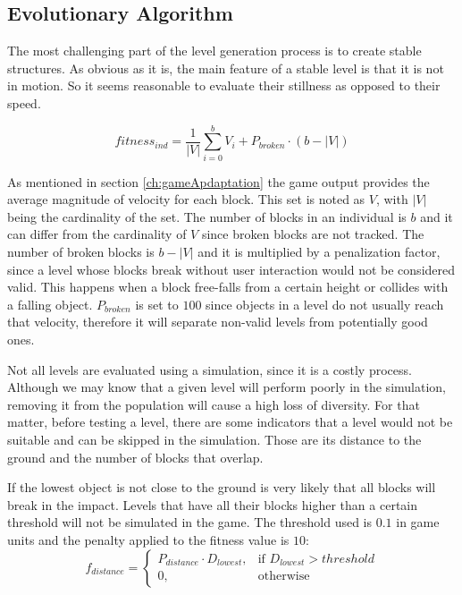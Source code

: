 \subsection{Evolutionary Algorithm}\label{ch:Representation}

The most challenging part of the level generation process is to create stable structures. As obvious as it is, the main feature of a stable level is that it is not in motion. So it seems reasonable to evaluate their stillness as opposed to their speed.

$$fitness_{ind} = \frac{1}{|V|}\sum_{i=0}^{b}{V_i} + P_{broken}\cdot(b-|V|)$$

As mentioned in section \ref{ch:gameApdaptation} the game output provides the average magnitude of velocity for each block. This set is noted as $V$, with $|V|$ being the cardinality of the set. The number of blocks in an individual is $b$ and it can differ from the cardinality of $V$ since broken blocks are not tracked. The number of broken blocks is $b-|V|$ and it is multiplied by a penalization factor, since a level whose blocks break without user interaction would not be considered valid. This happens when a block free-falls from a certain height or collides with a falling object. $P_{broken}$ is set to $100$ since objects in a level do not usually reach that velocity, therefore it will separate non-valid levels from potentially good ones.

  

Not all levels are evaluated using a simulation, since it is a costly process. Although we may know that a given level will perform poorly in the simulation, removing it from the population will cause a high loss of diversity. For that matter, before testing a level, there are some indicators that a level would not be suitable and can be skipped in the simulation. Those are its distance to the ground and the number of blocks that overlap.

If the lowest object is not close to the ground is very likely that all blocks will break in the impact. Levels that have all their blocks higher than a certain threshold will not be simulated in the game. The threshold used is $0.1$ in game units and the penalty applied to the fitness value is $10$:
$$f_{distance} = 
\begin{cases}
	P_{distance}\cdot D_{lowest}, & \text{if } D_{lowest} > threshold\\
	0, & \text{otherwise}
\end{cases}
 $$


